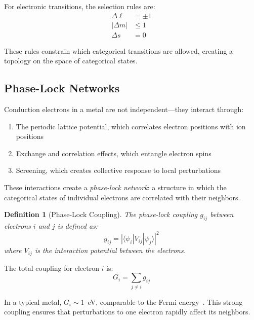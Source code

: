 \documentclass[twocolumn,showpacs,preprintnumbers,amsmath,amssymb,prd]{revtex4-2}
\newtheorem{definition}[theorem]{Definition}
\begin{document}
For electronic transitions, the selection rules are:
\begin{align}
\Delta\ell &= \pm 1 \label{eq:selection_ell}\\
|\Delta m| &\leq 1 \label{eq:selection_m}\\
\Delta s &= 0 \label{eq:selection_s}
\end{align}

These rules constrain which categorical transitions are allowed, creating a topology on the space of categorical states.

\subsection{Phase-Lock Networks}

Conduction electrons in a metal are not independent---they interact through:
\begin{enumerate}
\item The periodic lattice potential, which correlates electron positions with ion positions
\item Exchange and correlation effects, which entangle electron spins
\item Screening, which creates collective response to local perturbations
\end{enumerate}

These interactions create a \emph{phase-lock network}: a structure in which the categorical states of individual electrons are correlated with their neighbors.

\begin{definition}[Phase-Lock Coupling]
\label{def:phase_lock}
The phase-lock coupling $g_{ij}$ between electrons $i$ and $j$ is defined as:
\begin{equation}
g_{ij} = |\langle \psi_i | V_{ij} | \psi_j \rangle|^2
\label{eq:coupling_strength}
\end{equation}
where $V_{ij}$ is the interaction potential between the electrons.
\end{definition}

The total coupling for electron $i$ is:
\begin{equation}
G_i = \sum_{j \neq i} g_{ij}
\label{eq:total_coupling}
\end{equation}

In a typical metal, $G_i \sim 1$~eV, comparable to the Fermi energy~\cite{Ashcroft1976}. This strong coupling ensures that perturbations to one electron rapidly affect its neighbors.
\end{document}
